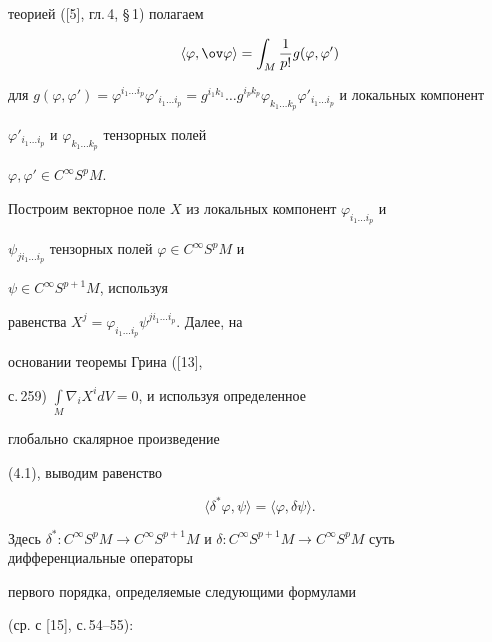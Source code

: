 теорией ([5], гл.\,4, \S\,1) полагаем 


\begin{equation} 


\langle\varphi,\ov\varphi \rangle=\int_M\frac{1}{p!} 


g(\varphi,\varphi') 


\end{equation} 


для $g(\varphi,\varphi')= \varphi^{i_1\dotsc i_p} \varphi'_{i_1\dotsc 


i_p}= g^{i_1k_1}\dotsc g^{i_p k_p} \varphi_{k_1\dotsc k_p} 


\varphi'_{i_1\dotsc i_p}$ и локальных компонент 


$\varphi'_{i_1\dotsc i_p}$ и $\varphi_{k_1\dotsc k_p}$ тензорных полей 


$\varphi,\varphi'\in C^\infty S^pM$. 


 


Построим векторное поле $X$ из локальных компонент $\varphi_{i_1\dotsc 


i_p}$ и 


$\psi_{ji_1\dotsc i_p}$ тензорных полей $\varphi\in C^\infty S^pM$ и 


$\psi\in C^\infty S^{p+1}M$, используя 


равенства $X^j=\varphi_{i_1\dotsc i_p}\psi^{ji_1\dotsc i_p}$. Далее, на 


основании теоремы Грина ([13], 


с.\,259) $\int\limits_M \nabla_i X^i dV=0$, и используя определенное 


глобально скалярное произведение 


(4.1), выводим равенство 


\begin{equation} 


\langle \delta^*\varphi,\psi\rangle=\langle 


\varphi,\delta\psi\rangle. 


\end{equation} 


Здесь $\delta^*:C^\infty S^pM\to C^\infty S^{p+1}M$ и $\delta:C^\infty 


S^{p+1}M\to C^\infty S^pM$ суть дифференциальные операторы 


первого порядка, определяемые следующими формулами 


(ср. с [15], с.\,54--55): 


$$ 


